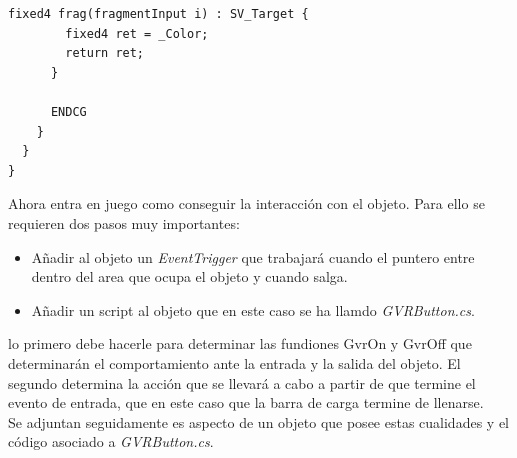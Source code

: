 \begin{lstlisting}[frame=single, caption={GvrReticleShader.shader}]
      fixed4 frag(fragmentInput i) : SV_Target {
        fixed4 ret = _Color;
        return ret;
      }

      ENDCG
    }
  }
}

\end{lstlisting}


\quad Ahora entra en juego como conseguir la interacción con el objeto. Para ello se requieren dos pasos muy importantes: \\

\begin{itemize}
	\item Añadir al objeto un \textit{EventTrigger} que trabajará cuando el puntero entre dentro del area que ocupa el objeto y cuando salga.
	\item Añadir un script al objeto que en este caso se ha llamdo \textit{GVRButton.cs}.
\end{itemize}

\quad lo primero debe hacerle para determinar las fundiones GvrOn y GvrOff que determinarán el comportamiento ante la entrada y la salida del objeto. El segundo determina la acción que se llevará a cabo a partir de que termine el evento de entrada, que en este caso que la barra de carga termine de llenarse.\\

\quad Se adjuntan seguidamente es aspecto de un objeto que posee estas cualidades y el código asociado a \textit{GVRButton.cs}.\\


